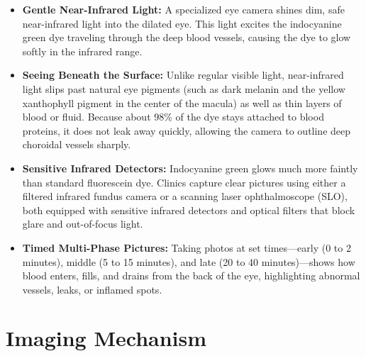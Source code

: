 \begin{itemize}
    \item \textbf{Gentle Near-Infrared Light:} A specialized eye camera shines dim, safe near-infrared light into the dilated eye. This light excites the indocyanine green dye traveling through the deep blood vessels, causing the dye to glow softly in the infrared range.
    \item \textbf{Seeing Beneath the Surface:} Unlike regular visible light, near-infrared light slips past natural eye pigments (such as dark melanin and the yellow xanthophyll pigment in the center of the macula) as well as thin layers of blood or fluid. Because about 98\% of the dye stays attached to blood proteins, it does not leak away quickly, allowing the camera to outline deep choroidal vessels sharply.
    \item \textbf{Sensitive Infrared Detectors:} Indocyanine green glows much more faintly than standard fluorescein dye. Clinics capture clear pictures using either a filtered infrared fundus camera or a scanning laser ophthalmoscope (SLO), both equipped with sensitive infrared detectors and optical filters that block glare and out-of-focus light.
    \item \textbf{Timed Multi-Phase Pictures:} Taking photos at set times---early (0 to 2 minutes), middle (5 to 15 minutes), and late (20 to 40 minutes)---shows how blood enters, fills, and drains from the back of the eye, highlighting abnormal vessels, leaks, or inflamed spots.
\end{itemize}

\section{Imaging Mechanism}

